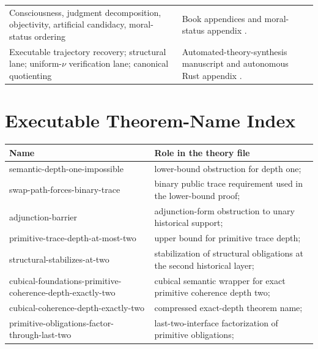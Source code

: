 \documentclass[11pt]{article}
\theoremstyle{plain}
\theoremstyle{definition}
\theoremstyle{remark}
\newcommand{\mname}[1]{\begingroup\ttfamily\footnotesize #1\endgroup}
\begin{document}
\begin{longtable}{@{}>{\raggedright\arraybackslash}p{}>{\raggedright\arraybackslash}p{}@{}}
Consciousness, judgment decomposition, objectivity, artificial candidacy, moral-status ordering
& Book appendices and moral-status appendix \cite{lande-book-appendices}. \\
Executable trajectory recovery; structural lane; uniform-\(\nu\) verification lane; canonical quotienting
& Automated-theory-synthesis manuscript and autonomous Rust appendix \cite{lande-automated,lande-autonomous-rust}. \\
\bottomrule
\end{longtable}

\section{Executable Theorem-Name Index}

\begin{longtable}{@{}>{\raggedright\arraybackslash}p{}>{\raggedright\arraybackslash}p{}@{}}
\toprule
Name & Role in the theory file \\
\midrule
\endhead
\mname{semantic-\allowbreak{}depth-\allowbreak{}one-\allowbreak{}impossible}
& lower-bound obstruction for depth one; \\
\mname{swap-\allowbreak{}path-\allowbreak{}forces-\allowbreak{}binary-\allowbreak{}trace}
& binary public trace requirement used in the lower-bound proof; \\
\mname{adjunction-\allowbreak{}barrier}
& adjunction-form obstruction to unary historical support; \\
\mname{primitive-\allowbreak{}trace-\allowbreak{}depth-\allowbreak{}at-\allowbreak{}most-\allowbreak{}two}
& upper bound for primitive trace depth; \\
\mname{structural-\allowbreak{}stabilizes-\allowbreak{}at-\allowbreak{}two}
& stabilization of structural obligations at the second historical layer; \\
\mname{cubical-\allowbreak{}foundations-\allowbreak{}primitive-\allowbreak{}coherence-\allowbreak{}depth-\allowbreak{}exactly-\allowbreak{}two}
& cubical semantic wrapper for exact primitive coherence depth two; \\
\mname{cubical-\allowbreak{}coherence-\allowbreak{}depth-\allowbreak{}exactly-\allowbreak{}two}
& compressed exact-depth theorem name; \\
\mname{primitive-\allowbreak{}obligations-\allowbreak{}factor-\allowbreak{}through-\allowbreak{}last-\allowbreak{}two}
& last-two-interface factorization of primitive obligations; \\

\end{longtable}
\end{document}
